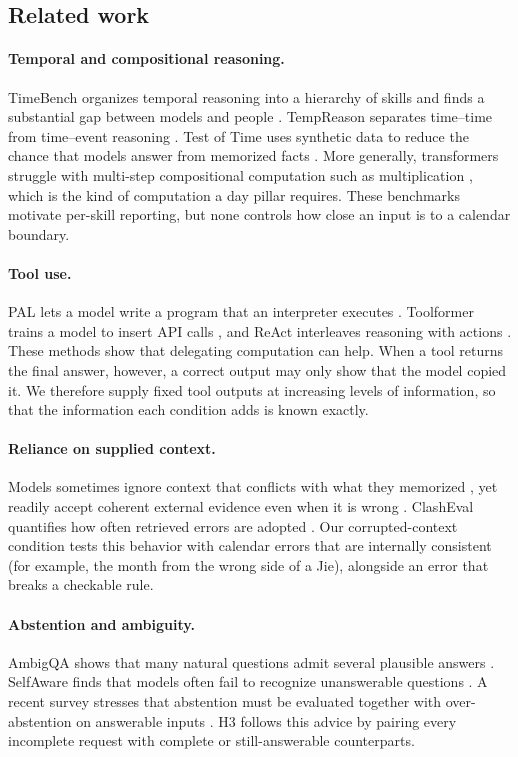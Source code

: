 \documentclass[12pt,letterpaper]{article}
\begin{document}
\subsection{Related work}

\paragraph{Temporal and compositional reasoning.} TimeBench organizes temporal reasoning into a hierarchy of skills and finds a substantial gap between models and people \citep{timebench}. TempReason separates time--time from time--event reasoning \citep{tempreason}. Test of Time uses synthetic data to reduce the chance that models answer from memorized facts \citep{testoftime}. More generally, transformers struggle with multi-step compositional computation such as multiplication \citep{faithfate}, which is the kind of computation a day pillar requires. These benchmarks motivate per-skill reporting, but none controls how close an input is to a calendar boundary.

\paragraph{Tool use.} PAL lets a model write a program that an interpreter executes \citep{pal}. Toolformer trains a model to insert API calls \citep{toolformer}, and ReAct interleaves reasoning with actions \citep{react}. These methods show that delegating computation can help. When a tool returns the final answer, however, a correct output may only show that the model copied it. We therefore supply fixed tool outputs at increasing levels of information, so that the information each condition adds is known exactly.

\paragraph{Reliance on supplied context.} Models sometimes ignore context that conflicts with what they memorized \citep{longpre}, yet readily accept coherent external evidence even when it is wrong \citep{xie}. ClashEval quantifies how often retrieved errors are adopted \citep{clasheval}. Our corrupted-context condition tests this behavior with calendar errors that are internally consistent (for example, the month from the wrong side of a Jie), alongside an error that breaks a checkable rule.

\paragraph{Abstention and ambiguity.} AmbigQA shows that many natural questions admit several plausible answers \citep{ambigqa}. SelfAware finds that models often fail to recognize unanswerable questions \citep{selfaware}. A recent survey stresses that abstention must be evaluated together with over-abstention on answerable inputs \citep{abstention}. H3 follows this advice by pairing every incomplete request with complete or still-answerable counterparts.
\end{document}
